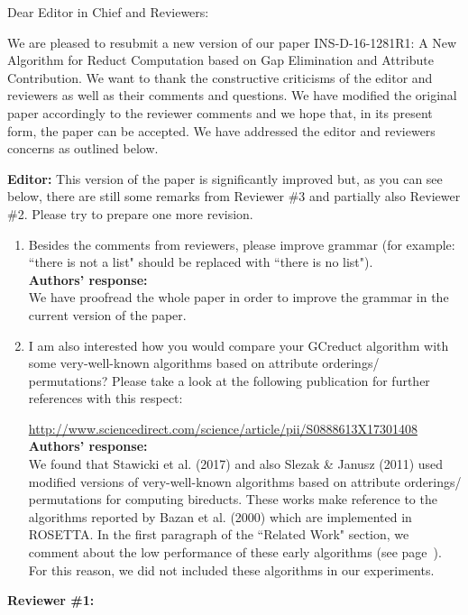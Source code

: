 \documentclass{letter}
\begin{document}
\begin{letter}{}
  \opening{Dear Editor in Chief and Reviewers:}

  We are pleased to resubmit a new version of our paper INS-D-16-1281R1: A New Algorithm for Reduct Computation based on Gap Elimination and Attribute Contribution. We want to thank the constructive criticisms of the editor and reviewers as well as their comments and questions. We have modified the original paper accordingly to the reviewer comments and we hope that, in its present form, the paper can be accepted. We have addressed the editor and reviewers concerns as outlined below.

  \textbf{Editor:} 
  This version of the paper is significantly improved but, as you can see below, there are still some remarks from Reviewer \#3 and partially also Reviewer \#2. Please try to prepare one more revision.
  \begin{enumerate}
	\item Besides the comments from reviewers, please improve grammar (for example: ``there is not a list" should be replaced with ``there is no list"). \\
	\textbf{Authors’ response:} \\
	We have proofread the whole paper in order to improve the grammar in the current version of the paper.
		 
	\item I am also interested how you would compare your GCreduct algorithm with some very-well-known algorithms based on attribute orderings/ permutations? Please take a look at the following publication for further references with this respect:
  
	\small{\url{ http://www.sciencedirect.com/science/article/pii/S0888613X17301408}}\\
	\normalsize
	\textbf{Authors’ response:} \\
	We found that Stawicki et al. (2017) and also Slezak \& Janusz (2011) used modified versions of very-well-known algorithms based on attribute orderings/ permutations for computing bireducts. These works make reference to the algorithms reported by Bazan et al. (2000) which are implemented in ROSETTA. In the first paragraph of the ``Related Work" section, we comment about the low performance of these early algorithms (see page~\pageref{early}). For this reason, we did not included these algorithms in our experiments.
  \end{enumerate}
  
  \textbf{Reviewer \#1:}
  

\end{letter}
\end{document}
